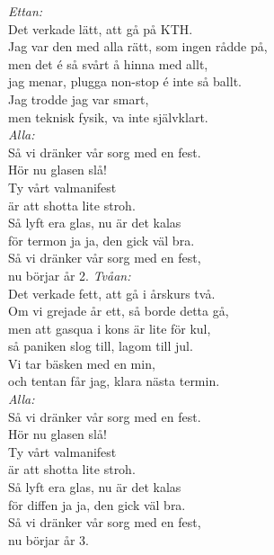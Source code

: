 \documentclass[a6paper,10pt]{article}
\begin{document}
\begin{center}
\end{center}
\textit{Ettan:} \\
Det verkade lätt, att gå på KTH. \\
Jag var den med alla rätt, som ingen rådde på, \\
men det é så svårt å hinna med allt, \\
jag menar, plugga non-stop é inte så ballt. \\
Jag trodde jag var smart, \\
men teknisk fysik, va inte självklart.
\vspace{5pt} \\
\textit{Alla:} \\
Så vi dränker vår sorg med en fest. \\
Hör nu glasen slå! \\
Ty vårt valmanifest \\
är att shotta lite stroh. \\
Så lyft era glas, nu är det kalas \\
för termon ja ja, den gick väl bra. \\
Så vi dränker vår sorg med en fest, \\
nu börjar år 2.
\newpage
\setlength{\oddsidemargin}{-0.47in}
\noindent
\textit{Tvåan:} \\
Det verkade fett, att gå i årskurs två. \\
Om vi grejade år ett, så borde detta gå, \\
men att gasqua i kons är lite för kul, \\
så paniken slog till, lagom till jul. \\
Vi tar bäsken med en min, \\
och tentan får jag, klara nästa termin.
\vspace{5pt} \\
\textit{Alla:} \\
Så vi dränker vår sorg med en fest. \\
Hör nu glasen slå! \\
Ty vårt valmanifest \\
är att shotta lite stroh. \\
Så lyft era glas, nu är det kalas \\
för diffen ja ja, den gick väl bra. \\
Så vi dränker vår sorg med en fest, \\
nu börjar år 3.
\vspace{5pt} \\
\end{document}
